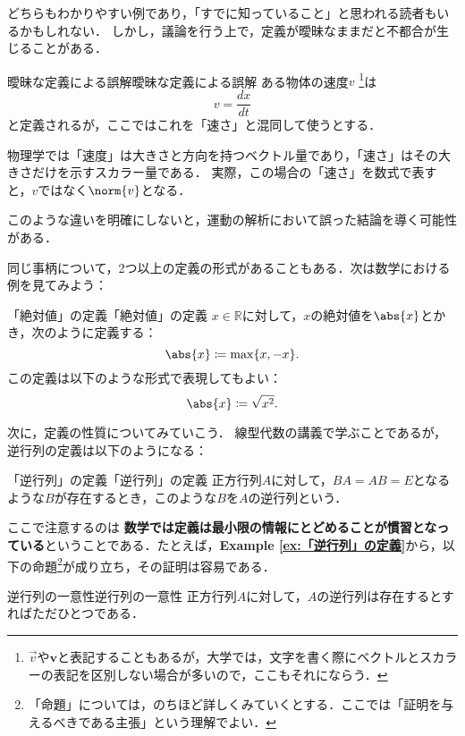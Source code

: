 \documentclass[a4paper,11pt]{ltjsarticle}
\renewcommand{\emph}[1]{\textbf{#1}}
\newcommand{\exref}[1]{{\bfseries\sffamily Example \ref{ex:#1}}}
\begin{document}
どちらもわかりやすい例であり，「すでに知っていること」と思われる読者もいるかもしれない．
しかし，議論を行う上で，定義が曖昧なままだと不都合が生じることがある．

\begin{example}{曖昧な定義による誤解}{曖昧な定義による誤解} 
  ある物体の速度$v$ \footnote{$\vec{v}$や$\bm{v}$と表記することもあるが，大学では，文字を書く際にベクトルとスカラーの表記を区別しない場合が多いので，ここもそれにならう．}は
  \[
  v = \frac{dx}{dt}
  \]
  と定義されるが，ここではこれを「速さ」と混同して使うとする．
  
  物理学では「速度」は大きさと方向を持つベクトル量であり，「速さ」はその大きさだけを示すスカラー量である．
  実際，この場合の「速さ」を数式で表すと，$v$ではなく$\norm{v}$となる．

  このような違いを明確にしないと，運動の解析において誤った結論を導く可能性がある．
\end{example}

同じ事柄について，2つ以上の定義の形式があることもある．次は数学における例を見てみよう：

\begin{example}{「絶対値」の定義}{「絶対値」の定義}
	$ x \in \mathbb{R}$に対して，$x$の絶対値を$\abs{x}$とかき，次のように定義する：
	\[
	\abs{x} \coloneqq \max \{ x , -x \} .
	\]
	この定義は以下のような形式で表現してもよい：
	\[
	\abs{x} \coloneqq  \sqrt{x^2}.
	\]
\end{example}

次に，定義の性質についてみていこう．
線型代数の講義で学ぶことであるが，逆行列の定義は以下のようになる：

\begin{example}{「逆行列」の定義}{「逆行列」の定義}
	正方行列$A$に対して，$BA = AB =E$となるような$B$が存在するとき，このような$B$を$A$の逆行列という．
\end{example}


ここで注意するのは \emph{数学では定義は最小限の情報にとどめることが慣習となっている}ということである．たとえば，\exref{「逆行列」の定義}から，以下の命題\footnote{「命題」については，のちほど詳しくみていくとする．ここでは「証明を与えるべきである主張」という理解でよい．}が成り立ち，その証明は容易である．

\begin{prop}{逆行列の一意性}{逆行列の一意性}
	正方行列$A$に対して，$A$の逆行列は存在するとすればただひとつである．
\end{prop}
\end{document}
